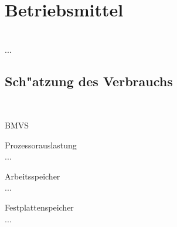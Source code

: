 %
%


\chapter{Betriebsmittel}
\label{BM}

~\\
...

\section{Sch{"a}tzung des Verbrauchs}
\label{BM:Verbrauch}

~\\

\begin{ids}{\gls{BMVS}}

	\id[10] Prozessorauslastung \hfill\\
	
	...
	
	\id[20] Arbeitsspeicher \hfill\\
	
	...
	
	\id[30] Festplattenspeicher \hfill\\
		
	...

\end{ids}


